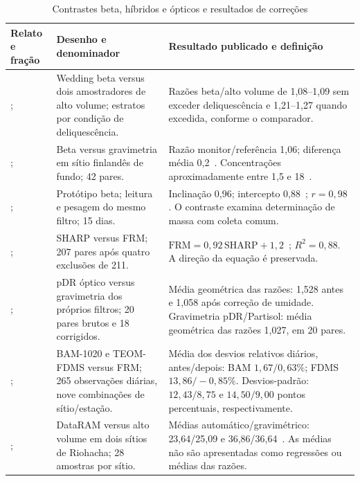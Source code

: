 \begin{table}[tbp]
\caption{Contrastes beta, híbridos e ópticos e resultados de correções}\label{tab:betaopticos}
\begingroup\singlespacing\fontsize{10}{12}\selectfont
\begin{tabularx}{\textwidth}{@{}P{.24\textwidth}P{.30\textwidth}X@{}}
\toprule\textbf{Relato e fração} & \textbf{Desenho e denominador} & \textbf{Resultado publicado e definição}\\\midrule
\textcite{rsl170}; \MPdez{} & Wedding beta versus dois amostradores de alto volume; estratos por condição de deliquescência. & Razões beta/alto volume de 1,08--1,09 sem exceder deliquescência e 1,21--1,27 quando excedida, conforme o comparador.\\\addlinespace
\textcite{rsl073}; \MPdez{} & Beta versus gravimetria em sítio finlandês de fundo; 42 pares. & Razão monitor/referência 1,06; diferença média 0,2~\ugm{}. Concentrações aproximadamente entre 1,5 e 18~\ugm{}.\\\addlinespace
\textcite{rsl214}; \MPdez{} & Protótipo beta; leitura e pesagem do mesmo filtro; 15 dias. & Inclinação 0,96; intercepto 0,88~\ugm{}; $r=0{,}98$. O contraste examina determinação de massa com coleta comum.\\\addlinespace
\textcite{rsl059}; \MPdoiscinco{} & SHARP versus FRM; 207 pares após quatro exclusões de 211. & $\mathrm{FRM}=0{,}92\,\mathrm{SHARP}+1{,}2$~\ugm{}; $R^2=0{,}88$. A direção da equação é preservada.\\\addlinespace
\textcite{rsl089}; \MPdoiscinco{} & pDR óptico versus gravimetria dos próprios filtros; 20 pares brutos e 18 corrigidos. & Média geométrica das razões: 1,528 antes e 1,058 após correção de umidade. Gravimetria pDR/Partisol: média geométrica das razões 1,027, em 20 pares.\\\addlinespace
\textcite{rsl085}; \MPdoiscinco{} & BAM-1020 e TEOM-FDMS versus FRM; 265 observações diárias, nove combinações de sítio/estação. & Média dos desvios relativos diários, antes/depois: BAM $1{,}67/0{,}63\%$; FDMS $13{,}86/-0{,}85\%$. Desvios-padrão: $12{,}43/8{,}75$ e $14{,}50/9{,}00$ pontos percentuais, respectivamente.\\\addlinespace
\textcite{rsl226}; \MPdez{} & DataRAM versus alto volume em dois sítios de Riohacha; 28 amostras por sítio. & Médias automático/gravimétrico: 23,64/25,09 e 36,86/36,64~\ugm{}. As médias não são apresentadas como regressões ou médias das razões.\\\bottomrule
\end{tabularx}
\endgroup
\end{table}
